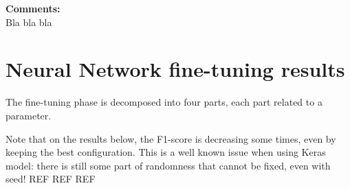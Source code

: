 \textbf{Comments:}\\
Bla bla bla



\chapter{Neural Network fine-tuning results}
\label{annex:nn-fine-tuning}

The fine-tuning phase is decomposed into four parts, each part related to a parameter.

Note that on the results below, the F1-score is decreasing some times, even by keeping the best configuration. This is a well known issue when using Keras model: there is still some part of randomness that cannot be fixed, even with seed! REF REF REF

